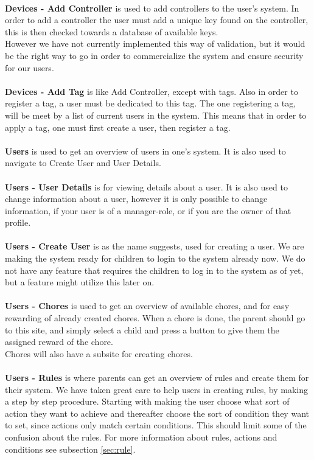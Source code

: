 \\
\textbf{Devices - Add Controller} is used to add controllers to the user's system. In order to add a controller the user must add a unique key found on the controller, this is then checked towards a database of available keys.\\
However we have not currently implemented this way of validation, but it would be the right way to go in order to commercialize the system and ensure security for our users.\\
\\
\textbf{Devices - Add Tag} is like Add Controller, except with tags. Also in order to register a tag, a user must be dedicated to this tag. The one registering a tag, will be meet by a list of current users in the system. This means that in order to apply a tag, one must first create a user, then register a tag.\\
\\
\textbf{Users} is used to get an overview of users in one's system. It is also used to navigate to Create User and User Details.\\
\\
\textbf{Users - User Details} is for viewing details about a user. It is also used to change information about a user, however it is only possible to change information, if your user is of a manager-role, or if you are the owner of that profile.\\
\\
\textbf{Users - Create User} is as the name suggests, used for creating a user. We are making the system ready for children to login to the system already now. We do not have any feature that requires the children to log in to the system as of yet, but a feature might utilize this later on.\\
\\
\textbf{Users - Chores} is used to get an overview of available chores, and for easy rewarding of already created chores. When a chore is done, the parent should go to this site, and simply select a child and press a button to give them the assigned reward of the chore.\\
Chores will also have a subsite for creating chores.\\
\\
\textbf{Users - Rules} is where parents can get an overview of rules and create them for their system. We have taken great care to help users in creating rules, by making a step by step procedure. Starting with making the user choose what sort of action they want to achieve and thereafter choose the sort of condition they want to set, since actions only match certain conditions. This should limit some of the confusion about the rules. For more information about rules, actions and conditions see subsection \vref{sec:rule}.\\
